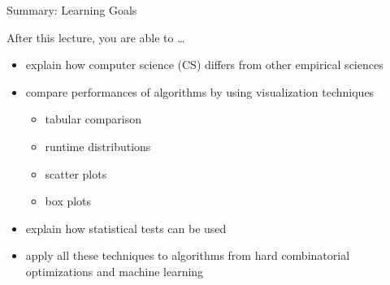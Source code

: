 \begin{frame}[c]{Summary: Learning Goals}

After this lecture, you are able to \ldots

\begin{itemize}
  \item explain how computer science (CS) differs from other empirical sciences
  \item compare performances of algorithms by using \alert{visualization techniques}
  \begin{itemize}
    \item tabular comparison
    \item runtime distributions
    \item scatter plots
    \item box plots
  \end{itemize}
  \item explain how \alert{statistical tests} can be used 
  \item \alert{apply all these techniques} to algorithms from hard combinatorial optimizations and machine learning
\end{itemize}

\end{frame}
